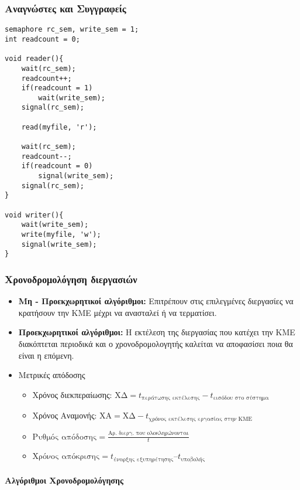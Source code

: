 \subsubsection{Αναγνώστες και Συγγραφείς}

\begin{lstlisting}
semaphore rc_sem, write_sem = 1;
int readcount = 0;

void reader(){
	wait(rc_sem);
	readcount++;
	if(readcount = 1)
		wait(write_sem);
	signal(rc_sem);
	
	read(myfile, 'r');
	
	wait(rc_sem);
	readcount--;
	if(readcount = 0)
		signal(write_sem);
	signal(rc_sem);
}

void writer(){
	wait(write_sem);
	write(myfile, 'w');
	signal(write_sem);
}
\end{lstlisting}


\subsubsection{Χρονοδρομολόγηση διεργασιών}

\begin{itemize}
	\item	\textbf{Μη - Προεκχωρητικοί αλγόριθμοι:}
		Επιτρέπουν στις επιλεγμένες διεργασίες να κρατήσουν την
		ΚΜΕ μέχρι να ανασταλεί ή να τερματίσει.
	\item	\textbf{Προεκχωρητικοί αλγόριθμοι:}
		Η εκτέλεση της διεργασίας που κατέχει την ΚΜΕ
		διακόπτεται περιοδικά και ο χρονοδρομολογητής καλείται
		να αποφασίσει ποια θα είναι η επόμενη.
	\item	Μετρικές απόδοσης
		\begin{itemize}
			\item 	Χρόνος διεκπεραίωσης: $ \text{ΧΔ} = t_\text{περάτωσης εκτέλεσης} - t_\text{εισόδου στο σύστημα} $
			\item 	Χρόνος Αναμονής: $ \text{ΧΑ} = \text{ΧΔ} - t_\text{χρόνος εκτέλεσης εργασίας στην ΚΜΕ} $
			\item 	$ \text{Ρυθμός απόδοσης} = \frac{\text{Αρ. διεργ. που ολοκληρώνονται}}{t} $
			\item	$ \text{Χρόνος απόκρισης} = t_\text{έναρξης εξυπηρέτησης} – t_\text{υποβολής} $
		\end{itemize}
\end{itemize}

\paragraph{Αλγόριθμοι Χρονοδρομολόγησης}

